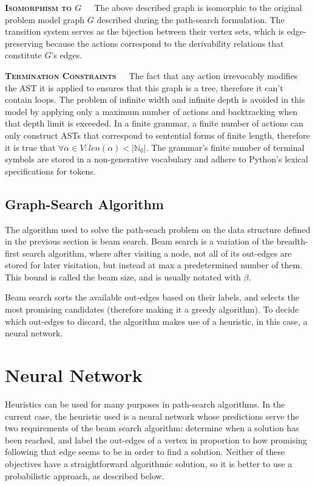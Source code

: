 \documentclass[12pt]{article}
\begin{document}
\textbf{\textsc{Isomorphism to $G$}}\ \ \ The above described graph is isomorphic to the original problem model graph $G$ described during the path-search formulation. The transition system serves as the bijection between their vertex sets, which is edge-preserving because the actions correspond to the derivability relations that constitute $G$'s edges.

\textbf{\textsc{Termination Constraints}}\ \ \ The fact that any action irrevocably modifies the AST it is applied to ensures that this graph is a tree, therefore it can't contain loops. The problem of infinite width and infinite depth is avoided in this model by applying only a maximum number of actions and backtracking when that depth limit is exceeded. In a finite grammar, a finite number of actions can only construct ASTs that correspond to sentential forms of finite length, therefore it is true that $\forall \alpha \in V : len(\alpha) < |\mathbb{N}_{0}|$. The grammar's finite number of terminal symbols are stored in a non-generative vocabulary and adhere to Python's lexical specifications for tokens.

\subsection{Graph-Search Algorithm}

The algorithm used to solve the path-seach problem on the data structure defined in the previous section is beam search. Beam search is a variation of the breadth-first search algorithm, where after visiting a node, not all of its out-edges are stored for later visitation, but instead at max a predetermined number of them. This bound is called the beam size, and is usually notated with $\beta$.

Beam search sorts the available out-edges based on their labels, and selects the most promising candidates (therefore making it a greedy algorithm). To decide which out-edges to discard, the algorithm makes use of a heuristic, in this case, a neural network.

\section{Neural Network}

Heuristics can be used for many purposes in path-search algorithms. In the current case, the heuristic used is a neural network whose predictions serve the two requirements of the beam search algorithm: determine when a solution has been reached, and label the out-edges of a vertex in proportion to how promising following that edge seems to be in order to find a solution. Neither of these objectives have a straightforward algorithmic solution, so it is better to use a probabilistic approach, as described below.
\end{document}
